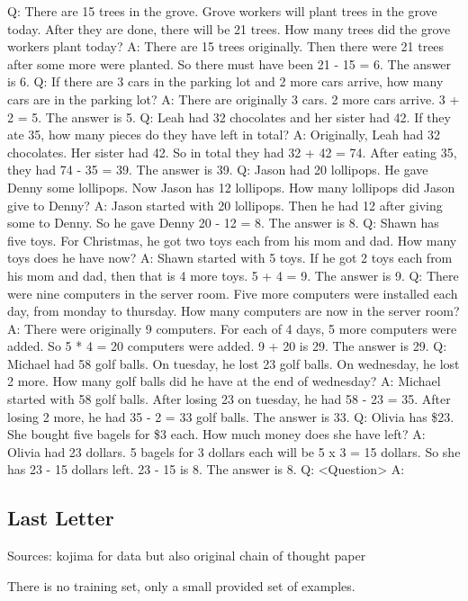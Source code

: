 \documentclass[11pt]{article}
\begin{document}
Q: There are 15 trees in the grove. Grove workers will plant trees in the grove today. After they are done, there
will be 21 trees. How many trees did the grove workers plant today?
A: There are 15 trees originally. Then there were 21 trees after some more were planted. So there must have
been 21 - 15 = 6. The answer is 6.
Q: If there are 3 cars in the parking lot and 2 more cars arrive, how many cars are in the parking lot?
A: There are originally 3 cars. 2 more cars arrive. 3 + 2 = 5. The answer is 5.
Q: Leah had 32 chocolates and her sister had 42. If they ate 35, how many pieces do they have left in total?
A: Originally, Leah had 32 chocolates. Her sister had 42. So in total they had 32 + 42 = 74. After eating 35, they
had 74 - 35 = 39. The answer is 39.
Q: Jason had 20 lollipops. He gave Denny some lollipops. Now Jason has 12 lollipops. How many lollipops did
Jason give to Denny?
A: Jason started with 20 lollipops. Then he had 12 after giving some to Denny. So he gave Denny 20 - 12 = 8.
The answer is 8.
Q: Shawn has five toys. For Christmas, he got two toys each from his mom and dad. How many toys does he
have now?
A: Shawn started with 5 toys. If he got 2 toys each from his mom and dad, then that is 4 more toys. 5 + 4 = 9.
The answer is 9.
Q: There were nine computers in the server room. Five more computers were installed each day, from monday
to thursday. How many computers are now in the server room?
A: There were originally 9 computers. For each of 4 days, 5 more computers were added. So 5 * 4 = 20
computers were added. 9 + 20 is 29. The answer is 29.
Q: Michael had 58 golf balls. On tuesday, he lost 23 golf balls. On wednesday, he lost 2 more. How many golf
balls did he have at the end of wednesday?
A: Michael started with 58 golf balls. After losing 23 on tuesday, he had 58 - 23 = 35. After losing 2 more, he
had 35 - 2 = 33 golf balls. The answer is 33.
Q: Olivia has \$23. She bought five bagels for \$3 each. How much money does she have left?
A: Olivia had 23 dollars. 5 bagels for 3 dollars each will be 5 x 3 = 15 dollars. So she has 23 - 15 dollars left. 23
- 15 is 8. The answer is 8.
Q: <Question>
A:

\subsection{Last Letter}

Sources: kojima for data but also original chain of thought paper

There is no training set, only a small provided set of examples.
\end{document}
